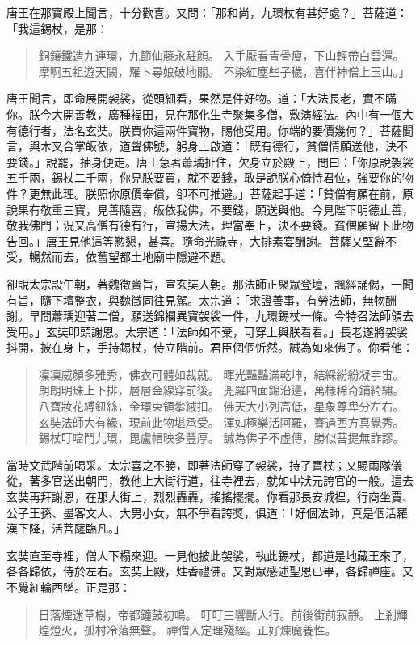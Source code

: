 唐王在那寶殿上聞言，十分歡喜。又問：「那和尚，九環杖有甚好處？」菩薩道：「我這錫杖，是那：
\begin{quote}
銅鑲鐵造九連環，九節仙藤永駐顏。
入手厭看青骨瘦，下山輕帶白雲還。
摩啊五祖遊天闕，羅卜尋娘破地關。
不染紅塵些子穢，喜伴神僧上玉山。」
\end{quote}

唐王聞言，即命展開袈裟，從頭細看，果然是件好物。道：「大法長老，實不瞞你。朕今大開善教，廣種福田，見在那化生寺聚集多僧，敷演經法。內中有一個大有德行者，法名玄奘。朕買你這兩件寶物，賜他受用。你端的要價幾何？」菩薩聞言，與木叉合掌皈依，道聲佛號，躬身上啟道：「既有德行，貧僧情願送他，決不要錢。」說罷，抽身便走。唐王急著蕭瑀扯住，欠身立於殿上，問曰：「你原說袈裟五千兩，錫杖二千兩，你見朕要買，就不要錢，敢是說朕心倚恃君位，強要你的物件？更無此理。朕照你原價奉償，卻不可推避。」菩薩起手道：「貧僧有願在前，原說果有敬重三寶，見善隨喜，皈依我佛，不要錢，願送與他。今見陛下明德止善，敬我佛門；況又高僧有德有行，宣揚大法，理當奉上，決不要錢。貧僧願留下此物告回。」唐王見他這等懃懇，甚喜。隨命光祿寺，大排素宴酬謝。菩薩又堅辭不受，暢然而去，依舊望都土地廟中隱避不題。

卻說太宗設午朝，著魏徵賫旨，宣玄奘入朝。那法師正聚眾登壇，諷經誦偈，一聞有旨，隨下壇整衣，與魏徵同往見駕。太宗道：「求證善事，有勞法師，無物酬謝。早間蕭瑀迎著二僧，願送錦襴異寶袈裟一件，九環錫杖一條。今特召法師領去受用。」玄奘叩頭謝恩。太宗道：「法師如不棄，可穿上與朕看看。」長老遂將袈裟抖開，披在身上，手持錫杖，侍立階前。君臣個個忻然。誠為如來佛子。你看他：
\begin{quote}
凜凜威顏多雅秀，佛衣可體如裁就。
暉光豔豔滿乾坤，結綵紛紛凝宇宙。
朗朗明珠上下排，層層金線穿前後。
兜羅四面錦沿邊，萬樣稀奇鋪綺繡。
八寶妝花縛鈕絲，金環束領攀絨扣。
佛天大小列高低，星象尊卑分左右。
玄奘法師大有緣，現前此物堪承受。
渾如極樂活阿羅，賽過西方真覺秀。
錫杖叮噹鬥九環，毘盧帽映多豐厚。
誠為佛子不虛傳，勝似菩提無詐謬。
\end{quote}

當時文武階前喝采。太宗喜之不勝，即著法師穿了袈裟，持了寶杖；又賜兩隊儀從，著多官送出朝門，教他上大街行道，往寺裡去，就如中狀元誇官的一般。這去玄奘再拜謝恩，在那大街上，烈烈轟轟，搖搖擺擺。你看那長安城裡，行商坐賈、公子王孫、墨客文人、大男小女，無不爭看誇獎，俱道：「好個法師，真是個活羅漢下降，活菩薩臨凡。」

玄奘直至寺裡，僧人下榻來迎。一見他披此袈裟，執此錫杖，都道是地藏王來了，各各歸依，侍於左右。玄奘上殿，炷香禮佛。又對眾感述聖恩已畢，各歸禪座。又不覺紅輪西墜。正是那：
\begin{quote}
日落煙迷草樹，帝都鐘鼓初鳴。
叮叮三響斷人行。前後街前寂靜。
上剎輝煌燈火，孤村冷落無聲。
禪僧入定理殘經。正好煉魔養性。
\end{quote}

